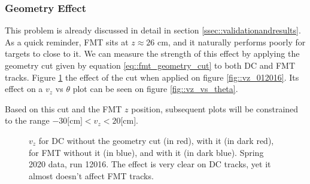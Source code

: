 \subsubsection{Geometry Effect}
    This problem is already discussed in detail in section \ref{ssec::validationandresults}.
    As a quick reminder, FMT sits at $z \approx 26$ cm, and it naturally performs poorly for targets to close to it.
    We can measure the strength of this effect by applying the geometry cut given by equation \eqref{eq::fmt_geometry_cut} to both DC and FMT tracks.
    Figure \ref{fig::vz_012016_geomcut} the effect of the cut when applied on figure \ref{fig::vz_012016}.
    Its effect on a $v_z$ vs $\theta$ plot can be seen on figure \ref{fig::vz_vs_theta}.

    Based on this cut and the FMT $z$ position, subsequent plots will be constrained to the range $-30 \text{[cm]} < v_z < 20 \text{[cm]}$.

    \begin{figure}[h!]
        \centering{}
        \caption[$v_z$ for DC and FMT, w/ and w/out the geometry cut, run 12016]{$v_z$ for DC without the geometry cut (in red), with it (in dark red), for FMT without it (in blue), and with it (in dark blue). Spring 2020 data, run 12016. The effect is very clear on DC tracks, yet it almost doesn't affect FMT tracks.}
        \label{fig::vz_012016_geomcut}
    \end{figure}
